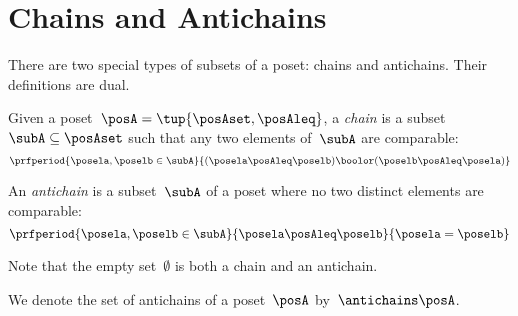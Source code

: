 
\section{Chains and Antichains}
\label{sec:chains-antichains}

There are two special types of subsets of a poset: chains and antichains.
Their definitions are dual.

\begin{definition}
    \label{def:chain}
    Given a poset~$\posA = \tup{\posAset, \posAleq}$, a \emph{chain} is a subset~$\subA \subseteq \posAset$ such that any two elements of~$\subA$ are comparable:
    \begin{equation}
        \prfperiod{
            \posela,\poselb \in \subA
        }{
            (\posela \posAleq  \poselb) \boolor (\poselb \posAleq  \posela)
        }
    \end{equation}
\end{definition}

\begin{definition}
    \label{def:antichain}
    An \emph{antichain} is a subset~$\subA$ of a poset where no two distinct elements are comparable:
    \begin{equation}
        \prfperiod{
            \posela,\poselb \in \subA
        }{
            \posela \posAleq \poselb
        }{
            \posela = \poselb
        }
    \end{equation}
\end{definition}
\begin{remark}
    Note that the empty set~$\emptyset$ is both a chain and an antichain.
\end{remark}

We denote the set of antichains of a poset~$\posA$ by~$\antichains\posA$.

